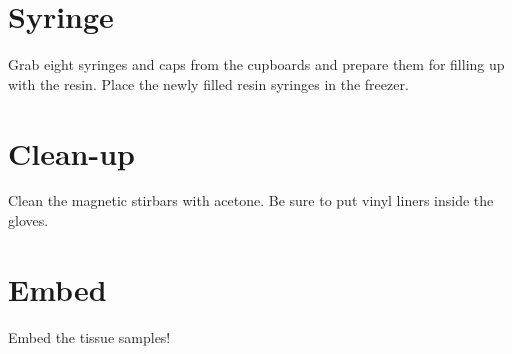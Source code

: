 \section{Syringe}
Grab eight syringes and caps from the cupboards and prepare them for filling up
with the resin.  Place the newly filled resin syringes in the freezer.  

\section{Clean-up}
Clean the magnetic stirbars with acetone.  Be sure to put vinyl liners inside
the gloves.

\section{Embed}
Embed the tissue samples!
